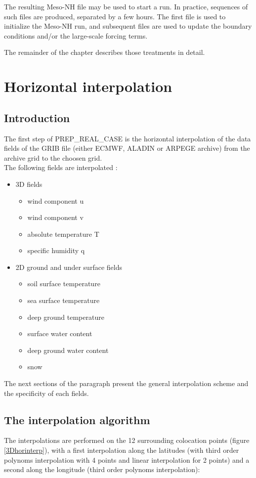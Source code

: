 The resulting Meso-NH file may be used to start a run. In practice,
sequences of such files are produced, separated by a few hours. The first
file is used to initialize the Meso-NH run, and subsequent files are
used to update the boundary conditions and/or the large-scale forcing
terms.

The remainder of the chapter describes those treatments in detail.

\section{Horizontal interpolation}

\subsection{Introduction}

The first step of PREP\_REAL\_CASE is the horizontal interpolation of the data fields
of the GRIB file (either ECMWF, ALADIN or ARPEGE archive) from the archive grid to the
choosen grid.\\

The following fields are interpolated :
\begin{itemize}
\item 3D fields
\begin{itemize}
\item wind component u
\item wind component v
\item absolute temperature T
\item specific humidity q
\end{itemize}
\item 2D ground and under surface fields
\begin{itemize}
\item soil surface temperature
\item sea surface temperature
\item deep ground temperature
\item surface water content
\item deep ground water content
\item snow
\end{itemize}
\end{itemize}

The next sections of the paragraph present the general interpolation scheme
and the specificity of each fields.

\subsection{The interpolation algorithm}
The interpolations are performed on the 12 surrounding colocation points
(figure \ref{3Dhorinterp}), with a first interpolation along the latitudes
(with third order polynoms interpolation with 4 points and linear interpolation
for 2 points) and a second along the longitude (third order polynoms
interpolation):

